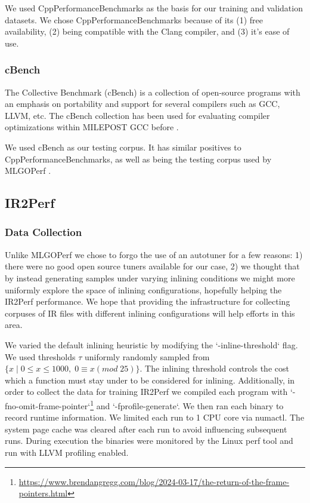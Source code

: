 \documentclass[nohyperref]{article}
\theoremstyle{plain}
\theoremstyle{definition}
\theoremstyle{remark}
\begin{document}
We used CppPerformanceBenchmarks as the basis for our training and validation datasets. We chose CppPerformanceBenchmarks because of its (1) free availability, (2) being compatible with the Clang compiler, and (3) it's ease of use.

\subsubsection{cBench}
The Collective Benchmark (cBench) is a collection of open-source programs with an emphasis on portability and support for several compilers such as GCC, LLVM, etc. The cBench collection has been used for evaluating compiler optimizations within MILEPOST GCC before \cite{cbench}.

We used cBench as our testing corpus. It has similar positives to CppPerformanceBenchmarks, as well as being the testing corpus used by MLGOPerf \cite{mlgoperf}.

\subsection{IR2Perf}
\subsubsection{Data Collection}
Unlike MLGOPerf we chose to forgo the use of an autotuner for a few reasons: 1) there were no good open source tuners available for our case, 2) we thought that by instead generating samples under varying inlining conditions we might more uniformly explore the space of inlining configurations, hopefully helping the IR2Perf performance. We hope that providing the infrastructure for collecting corpuses of IR files with different inlining configurations will help efforts in this area.

We varied the default inlining heuristic by modifying the `-inline-threshold` flag. We used thresholds $\tau$ uniformly randomly sampled from $\bigr\{x\;|\;0 \leq x \leq 1000,\;0 \equiv x (mod\;25)\bigr\}$. The inlining threshold controls the cost which a function must stay under to be considered for inlining. Additionally, in order to collect the data for training IR2Perf we compiled each program with `-fno-omit-frame-pointer`\footnote{\href{https://www.brendangregg.com/blog/2024-03-17/the-return-of-the-frame-pointers.html}{https://www.brendangregg.com/blog/2024-03-17/the-return-of-the-frame-pointers.html}} and `-fprofile-generate`.
We then ran each binary to record runtime information. We limited each run to 1 CPU core via numactl. The system page cache was cleared after each run to avoid influencing subsequent runs. During execution the binaries were monitored by the Linux perf tool and run with LLVM profiling enabled.
\end{document}
